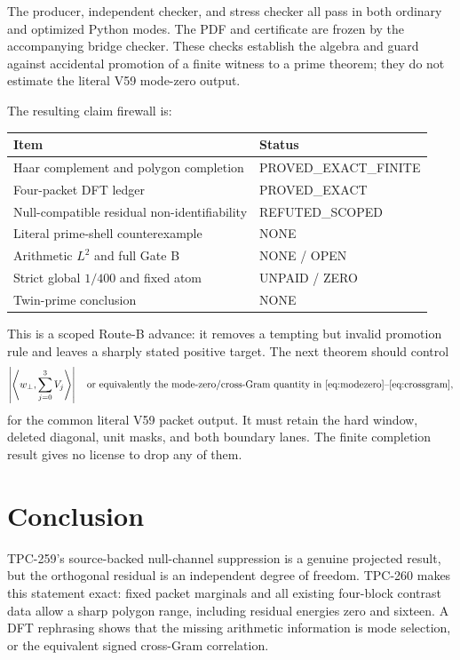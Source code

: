 \documentclass[11pt]{article}
\theoremstyle{definition}
\newcommand{\ip}[2]{\left\langle #1,#2\right\rangle}
\begin{document}
The producer, independent checker, and stress checker all pass in both ordinary
and optimized Python modes.  The PDF and certificate are frozen by the accompanying
bridge checker.  These checks establish the algebra and guard against accidental
promotion of a finite witness to a prime theorem; they do not estimate the literal
V59 mode-zero output.

The resulting claim firewall is:
\begin{center}
\begin{tabular}{ll}
\toprule
Item & Status\\
\midrule
Haar complement and polygon completion & PROVED\_EXACT\_FINITE\\
Four-packet DFT ledger & PROVED\_EXACT\\
Null-compatible residual non-identifiability & REFUTED\_SCOPED\\
Literal prime-shell counterexample & NONE\\
Arithmetic $L^2$ and full Gate B & NONE / OPEN\\
Strict global $1/400$ and fixed atom & UNPAID / ZERO\\
Twin-prime conclusion & NONE\\
\bottomrule
\end{tabular}
\end{center}

This is a scoped Route-B advance: it removes a tempting but invalid promotion rule
and leaves a sharply stated positive target.  The next theorem should control
\[
 \left|\ip{w_\perp}{\sum_{j=0}^3V_j}\right|
 \quad\text{or equivalently the mode-zero/cross-Gram quantity in
 \eqref{eq:modezero}--\eqref{eq:crossgram},}
\]
for the common literal V59 packet output.  It must retain the hard window, deleted
diagonal, unit masks, and both boundary lanes.  The finite completion result gives
no license to drop any of them.

\section{Conclusion}

TPC-259's source-backed null-channel suppression is a genuine projected result, but
the orthogonal residual is an independent degree of freedom.  TPC-260 makes this
statement exact: fixed packet marginals and all existing four-block contrast data
allow a sharp polygon range, including residual energies zero and sixteen.  A DFT
rephrasing shows that the missing arithmetic information is mode selection, or the
equivalent signed cross-Gram correlation.
\end{document}
